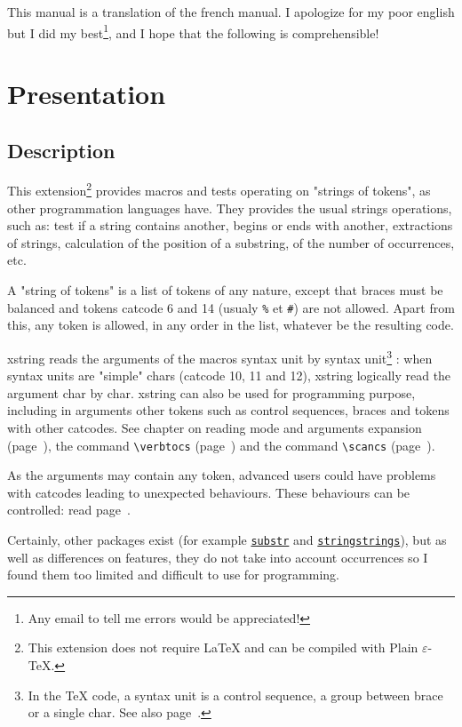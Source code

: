 \documentclass[a4paper,10pt]{article}
\newcommand\guill[1]{"#1"}
\newcommand\US{syntax unit\xspace}
\newcommand\USs{syntax units\xspace}
\newcommand\Xstring{\textsf{xstring}\xspace}
\newcommand\verbinline{\lstinline[basicstyle=\normalsize\ttfamily]}
\begin{document}
\tableofcontents

This manual is a translation of the french manual. I apologize for my poor english but I did my best\footnote{Any email to tell me errors would be appreciated!}, and I hope that the following is comprehensible!
\section{Presentation}
\subsection{Description}
This extension\footnote{This extension does not require \LaTeX{} and can be compiled with Plain $\varepsilon$-\TeX{}.} provides macros and tests operating on "strings of tokens", as other programmation languages have. They provides the usual strings operations, such as: test if a string contains another, begins or ends with another, extractions of strings, calculation of the position of a substring, of the number of occurrences, etc.\medskip

A "string of tokens" is a list of tokens of any nature, except that braces must be balanced and tokens catcode 6 and 14 (usualy \verb|%| et \verb|#|) are not allowed. Apart from this, any token is allowed, in any order in the list, whatever be the resulting code.\medskip

\Xstring reads the arguments of the macros \US by \US\footnote{In the \TeX{} code, a \US is a control sequence, a group between brace or a single char. See also page~\pageref{developpementarguments}.} : when \USs are \guill{simple} chars (catcode 10, 11 and 12), \Xstring logically read the argument char by char. \Xstring can also be used for programming purpose, including in arguments other tokens such as control sequences, braces and tokens with other catcodes. See chapter on reading mode and arguments expansion (page~\pageref{developpementarguments}), the command \verbinline|\verbtocs| (page~\pageref{verbtocs}) and the command \verbinline|\scancs| (page~\pageref{scancs}).\medskip

As the arguments may contain any token, advanced users could have problems with catcodes leading to unexpected behaviours. These behaviours can be controlled: read page~\pageref{macrosetoilees}.\medskip

Certainly, other packages exist (for example \href{http://www.ctan.org/tex-archive/macros/latex/contrib/substr/}{\nolinkurl{substr}} and \href{http://www.ctan.org/tex-archive/macros/latex/contrib/stringstrings/}{\nolinkurl{stringstrings}}), but as well as differences on features, they do not take into account occurrences so I found them too limited and difficult to use for programming.
\end{document}
